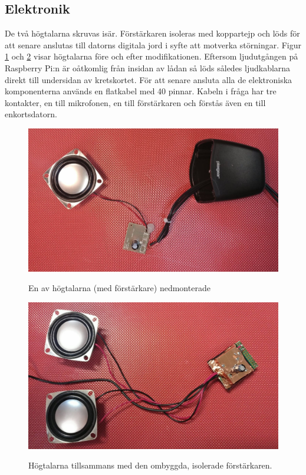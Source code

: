 \subsection{Elektronik}
De två högtalarna skruvas isär. Förstärkaren isoleras med koppartejp och löds för att senare anslutas till datorns digitala jord i syfte att motverka störningar. Figur \ref{fig:speaker_before} och \ref{fig:speaker_after} visar högtalarna före och efter modifikationen. Eftersom ljudutgången på Raspberry Pi:n är oåtkomlig från insidan av lådan så löds således ljudkablarna direkt till undersidan av kretskortet. 
För att senare ansluta alla de elektroniska komponenterna används en flatkabel med 40 pinnar. Kabeln i fråga har tre kontakter, en till mikrofonen, en till förstärkaren och förstås även en till enkortsdatorn.


\begin{figure}[H]
    \centering
    \caption{\small En av högtalarna (med förstärkare) nedmonterade}
    \includegraphics[width=12cm]{bilder/speaker_before_change.jpg}
    \label{fig:speaker_before}
\end{figure}

\begin{figure}[H]
    \centering
    \caption{\small Högtalarna tillsammans med den ombyggda, isolerade förstärkaren.}
    \includegraphics[width=12cm]{bilder/speakers_and_amplifier.jpg}
    \label{fig:speaker_after}
\end{figure}


